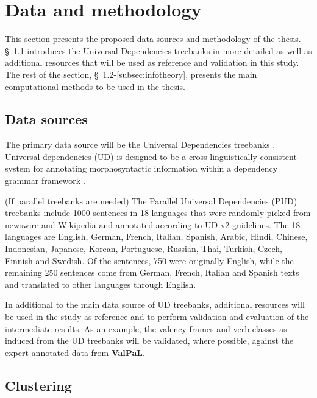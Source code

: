 \section{Data and methodology}

This section presents the proposed data sources and methodology of the thesis. \S~\ref{subsec:data-sources} introduces the Universal Dependencies treebanks in more detailed as well as additional resources that will be used as reference and validation in this study. The rest of the section, \S~\ref{subsec:clustering}-\ref{subsec:infotheory}, presents the main computational methods to be used in the thesis.

\subsection{Data sources}\label{subsec:data-sources}

The primary data source will be the Universal Dependencies treebanks \citep{universaldep}. Universal dependencies (UD) is designed to be a cross-linguistically consistent system for annotating morphosyntactic information within a dependency grammar framework \citep{demarneffe2021}. 

(If parallel treebanks are needed) The Parallel Universal Dependencies (PUD) treebanks \citep{zeman2017} include 1000 sentences in 18 languages that were randomly picked from newswire and Wikipedia and annotated according to UD v2 guidelines. The 18 languages are English, German, French, Italian, Spanish, Arabic, Hindi, Chinese, Indonesian, Japanese, Korean, Portuguese, Russian, Thai, Turkish, Czech, Finnish and Swedish. Of the sentences, 750 were originally English, while the remaining 250 sentences come from German, French, Italian and Spanish texts and translated to other languages through English.


In additional to the main data source of UD treebanks, additional resources will be used in the study as reference and to perform validation and evaluation of the intermediate results. As an example, the valency frames and verb classes as induced from the UD treebanks will be validated, where possible, against the expert-annotated data from \textbf{ValPaL}\citep{valpal}. 

\subsection{Clustering}\label{subsec:clustering}


